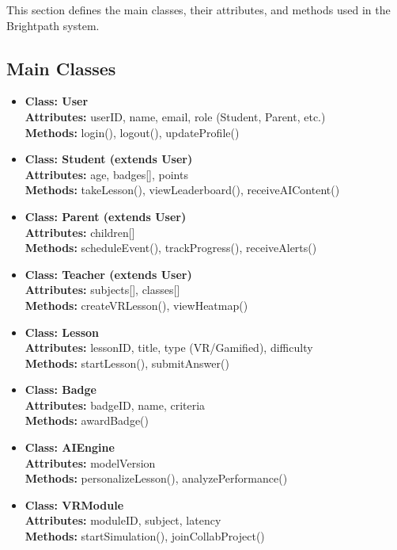 \documentclass[12pt,a4paper]{article}
\begin{document}
This section defines the main classes, their attributes, and methods used in the Brightpath system.

\subsection*{Main Classes}
\begin{itemize}
  \item \textbf{Class: User} \\
  \textbf{Attributes:} userID, name, email, role (Student, Parent, etc.) \\
  \textbf{Methods:} login(), logout(), updateProfile()
  
  \item \textbf{Class: Student (extends User)} \\
  \textbf{Attributes:} age, badges[], points \\
  \textbf{Methods:} takeLesson(), viewLeaderboard(), receiveAIContent()

  \item \textbf{Class: Parent (extends User)} \\
  \textbf{Attributes:} children[] \\
  \textbf{Methods:} scheduleEvent(), trackProgress(), receiveAlerts()

  \item \textbf{Class: Teacher (extends User)} \\
  \textbf{Attributes:} subjects[], classes[] \\
  \textbf{Methods:} createVRLesson(), viewHeatmap()

  \item \textbf{Class: Lesson} \\
  \textbf{Attributes:} lessonID, title, type (VR/Gamified), difficulty \\
  \textbf{Methods:} startLesson(), submitAnswer()

  \item \textbf{Class: Badge} \\
  \textbf{Attributes:} badgeID, name, criteria \\
  \textbf{Methods:} awardBadge()

  \item \textbf{Class: AIEngine} \\
  \textbf{Attributes:} modelVersion \\
  \textbf{Methods:} personalizeLesson(), analyzePerformance()

  \item \textbf{Class: VRModule} \\
  \textbf{Attributes:} moduleID, subject, latency \\
  \textbf{Methods:} startSimulation(), joinCollabProject()
\end{itemize}
\end{document}
